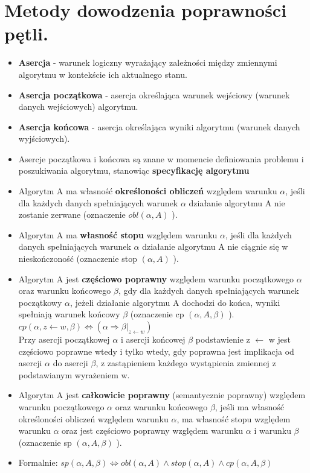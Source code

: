\documentclass[12pt]{article}
\begin{document}
    \section{Metody dowodzenia poprawności pętli.}

    \begin{itemize}
        \item \textbf{Asercja} - warunek logiczny wyrażający zależności między zmiennymi
        algorytmu w kontekście ich aktualnego stanu.
        \item \textbf{Asercja początkowa} - asercja określająca warunek wejściowy (warunek danych wejściowych) algorytmu.
        \item \textbf{Asercja końcowa} - asercja określająca wyniki algorytmu (warunek
        danych wyjściowych).
        \item Asercje początkowa i końcowa są znane w momencie definiowania
        problemu i poszukiwania algorytmu, stanowiąc \textbf{specyfikację algorytmu}
    \end{itemize}

    \begin{itemize}
        \item Algorytm A ma własność \textbf{określoności obliczeń} względem warunku $\alpha$, jeśli dla każdych danych spełniających warunek $\alpha$ działanie algorytmu A nie zostanie zerwane
        (oznaczenie $obl ( \alpha, A )$ ).
        \item Algorytm A ma \textbf{własność stopu} względem warunku $\alpha$, jeśli dla każdych danych spełniających warunek $\alpha$ działanie algorytmu A nie ciągnie się w nieskończoność (oznaczenie stop $( \alpha, A )$ ).
        \item Algorytm A jest \textbf{częściowo poprawny} względem warunku początkowego $\alpha$ oraz warunku końcowego $\beta$, gdy dla każdych danych spełniających warunek początkowy $\alpha$, jeżeli działanie algorytmu A dochodzi do końca, wyniki spełniają warunek końcowy $\beta$ (oznaczenie cp $( \alpha, A, \beta)$ ).\\
        $cp ( \alpha, z \leftarrow w, \beta ) \iff ( \alpha \Rightarrow \beta|_{z \leftarrow w})$\\
        Przy asercji początkowej $\alpha$ i asercji końcowej $\beta$ podstawienie z $\leftarrow$ w jest częściowo poprawne wtedy i tylko wtedy, gdy
        poprawna jest implikacja od asercji $\alpha$ do asercji $\beta$, z zastąpieniem każdego wystąpienia zmiennej z podstawianym
        wyrażeniem w.
        \item Algorytm A jest \textbf{całkowicie poprawny} (semantycznie poprawny) względem warunku
        początkowego $\alpha$ oraz warunku końcowego $\beta$, jeśli ma własność określoności obliczeń
        względem warunku $\alpha$, ma własność stopu względem warunku $\alpha$ oraz jest częściowo
        poprawny względem warunku $\alpha$ i warunku $\beta$ (oznaczenie sp $( \alpha, A, \beta )$ ).
        \item Formalnie:
        $sp ( \alpha, A, \beta ) \iff obl ( \alpha, A ) \wedge stop ( \alpha, A ) \wedge cp ( \alpha, A, \beta )$
    \end{itemize}
\end{document}
